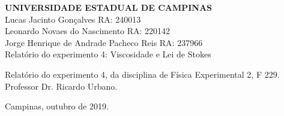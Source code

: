 \documentclass[a4paper, 11pt]{article}
\begin{document}

\thispagestyle{empty}
\begin{titlepage}
 \vfill
  \begin{center}
   {\large \textbf{UNIVERSIDADE ESTADUAL DE CAMPINAS}} \\[3cm] %

   {\large Lucas Jacinto Gonçalves RA: 240013 }\\[0.25cm] %
   {\large Leonardo Novaes do Nascimento RA: 220142 }\\[0.25cm]
   {\large Jorge Henrique de Andrade Pacheco Reis RA: 237966 }\\[5.5cm]


   {\Large Relatório do experimento 4: Viscosidade e Lei de Stokes}\\[6cm] %

   \hspace{.45\textwidth} %
   \begin{minipage}{.5\textwidth}
   \large Relatório do experimento 4, da disciplina de Física Experimental 2, F 229.\\[1cm]
Professor Dr. Ricardo Urbano.		%
  \end{minipage}
  \vfill

\vspace{2cm}

\large Campinas, outubro de 2019. 	%


\end{center}

\end{titlepage}

\end{document}
